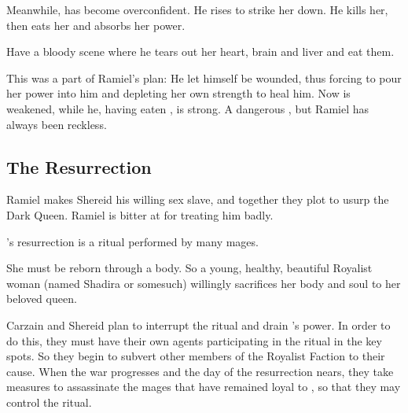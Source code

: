 Meanwhile, \Dominice{} has become overconfident. 
He rises to strike her down. 
He kills her, then eats her and absorbs her power. 

Have a bloody scene where he tears out her heart, brain and liver and eat them. 

This was a part of Ramiel's plan: 
He let himself be wounded, thus forcing \Belzir{} to pour her power into him and depleting her own strength to heal him. 
Now \Belzir{} is weakened, while he, having eaten \Dominice, is strong.
A dangerous , but Ramiel has always been reckless. 












\subsection{The Resurrection} 
Ramiel makes Shereid his willing sex slave, and together they plot to usurp the Dark Queen. 
Ramiel is bitter at \Belzir{} for treating him badly. 


\Belzir's resurrection is a ritual performed by many mages. 

She must be reborn through a \human{} body. 
So a young, healthy, beautiful Royalist woman (named Shadira or somesuch) willingly sacrifices her body and soul to her beloved queen. 

Carzain and Shereid plan to interrupt the ritual and drain \Belzir's power. 
In order to do this, they must have their own agents participating in the ritual in the key spots. 
So they begin to subvert other members of the Royalist Faction to their cause. 
When the war progresses and the day of the resurrection nears, they take measures to assassinate the mages that have remained loyal to \Belzir, so that they may control the ritual. 

